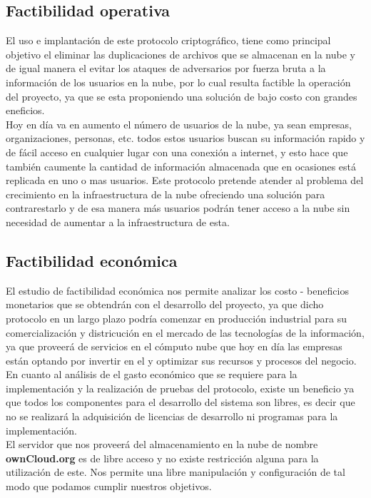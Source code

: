 \subsection{Factibilidad operativa}
El uso e implantación de este protocolo criptográfico, tiene como principal objetivo el eliminar las duplicaciones de archivos que se almacenan en la nube y de igual manera el evitar los ataques de adversarios por fuerza bruta a la información de los usuarios en la nube, por lo cual resulta factible la operación del proyecto, ya que se esta proponiendo una solución de bajo costo con grandes eneficios.\\
Hoy en día va en aumento el número de usuarios de la nube, ya sean empresas, organizaciones, personas, etc. todos estos usuarios buscan su información rapido y de fácil acceso en cualquier lugar con una conexión a internet, y esto hace que también caumente la cantidad de información almacenada que en ocasiones está replicada en uno o mas usuarios.
Este protocolo pretende atender al problema del crecimiento en la infraestructura de la nube ofreciendo una solución para contrarestarlo y de esa manera más usuarios podrán tener acceso a la nube sin necesidad de aumentar a la infraestructura de esta.

\subsection{Factibilidad económica}
El estudio de factibilidad económica nos permite analizar los costo - beneficios monetarios que se obtendrán con el desarrollo del proyecto, ya que dicho protocolo en un largo plazo podría comenzar en producción industrial para su comercialización y districución en el mercado de las tecnologías de la información, ya que proveerá de servicios en el cómputo nube que hoy en día las empresas están optando por invertir en el y optimizar sus recursos y procesos del negocio. \\

En cuanto al análisis de el gasto económico que se requiere para la implementación y la realización de pruebas del protocolo, existe un beneficio ya que todos los componentes para el desarrollo del sistema son libres, es decir que no se realizará la adquisición de licencias de desarrollo ni programas para la implementación. 
\\ El servidor que nos proveerá del almacenamiento en la nube de nombre \textbf{ownCloud.org} es de libre acceso y no existe restricción alguna para la utilización de este. Nos permite una libre manipulación y configuración de tal modo que podamos cumplir nuestros objetivos.

